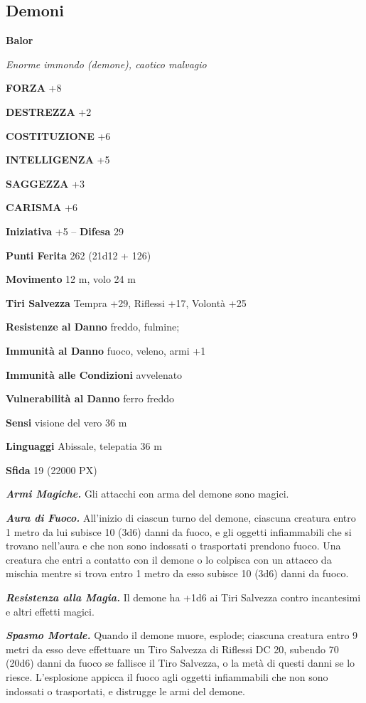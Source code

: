 \begin{multicols}{2}
\subsection{Demoni}

\medskip{}\textbf{Balor}

\textit{Enorme immondo (demone), caotico malvagio}

\textbf{FORZA} +8

\textbf{DESTREZZA} +2

\textbf{COSTITUZIONE} +6

\textbf{INTELLIGENZA} +5

\textbf{SAGGEZZA} +3

\textbf{CARISMA} +6

\textbf{Iniziativa} +5 -- \textbf{Difesa} 29

\textbf{Punti Ferita} 262 (21d12 + 126)

\textbf{Movimento} 12 m, volo 24 m

\textbf{Tiri Salvezza} Tempra +29, Riflessi +17, Volontà +25

\textbf{Resistenze al Danno} freddo, fulmine;

\textbf{Immunità al Danno} fuoco, veleno, armi +1

\textbf{Immunità alle Condizioni} avvelenato

\textbf{Vulnerabilità al Danno} ferro freddo

\textbf{Sensi} visione del vero 36 m

\textbf{Linguaggi} Abissale, telepatia 36 m

\textbf{Sfida} 19 (22000 PX)

\textit{\textbf{Armi Magiche.}} Gli attacchi con arma del demone sono magici.

\textit{\textbf{Aura di Fuoco.}} All'inizio di ciascun turno del demone, ciascuna creatura entro 1 metro da lui subisce 10 (3d6) danni da fuoco, e gli oggetti infiammabili che si trovano nell'aura e che non sono indossati o trasportati prendono fuoco. Una creatura che entri a contatto con il demone o lo colpisca con un attacco da mischia mentre si trova entro 1 metro da esso subisce 10 (3d6) danni da fuoco.

\textit{\textbf{Resistenza alla Magia.}} Il demone ha +1d6 ai Tiri Salvezza contro incantesimi e altri effetti magici.

\textit{\textbf{Spasmo Mortale.}} Quando il demone muore, esplode; ciascuna creatura entro 9 metri da esso deve effettuare un Tiro Salvezza di Riflessi DC 20, subendo 70 (20d6) danni da fuoco se fallisce il Tiro Salvezza, o la metà di questi danni se lo riesce. L'esplosione appicca il fuoco agli oggetti infiammabili che non sono indossati o trasportati, e distrugge le armi del demone.


\end{multicols}
